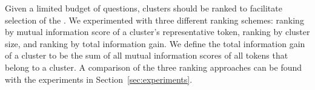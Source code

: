 Given a limited budget of questions, clusters should be ranked to facilitate selection of the \topk.  We experimented with three different ranking schemes: ranking by mutual information score of a cluster's representative token, ranking by cluster size, and ranking by total information gain.  We define the total information gain of a cluster to be the sum of all mutual information scores of all tokens that belong to a cluster.  A comparison of the three ranking approaches can be found with the experiments in Section~\ref{sec:experiments}.
\eat{
}
